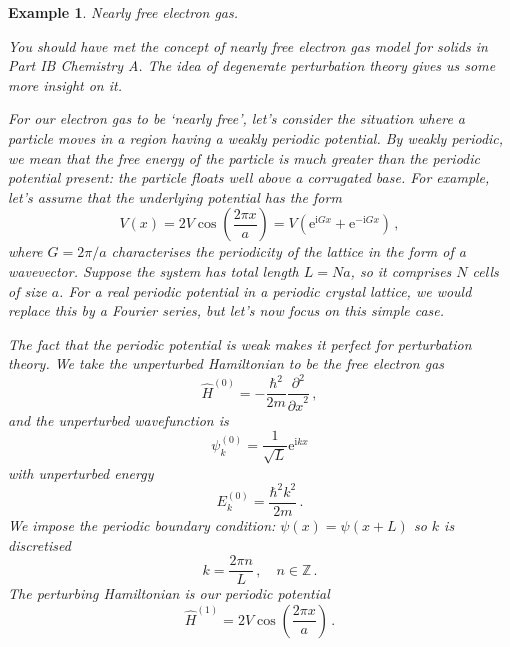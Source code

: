 \documentclass{article}
\theoremstyle{plain}\theoremheaderfont{\normalfont\itshape}\theorembodyfont{\rmfamily}\theoremseparator{.}\newtheorem*{rem}{Remark}\newtheorem*{ex}{Example}\newtheorem*{proof}{Proof}\newtheorem*{altp}{Alternative proof}
\theoremstyle{plain}\theoremheaderfont{\normalfont\bfseries}\theorembodyfont{\rmfamily}\theoremseparator{.}\newtheorem{thm}{Theorem}[section]\newtheorem{lem}[thm]{Lemma}\newtheorem{prop}[thm]{Proposition}\newtheorem*{cor}{Corollary}\newtheorem{defn}[thm]{Definition}\newtheorem{clm}[thm]{Claim}\newtheorem{clminproof}{Claim}
\theoremstyle{break}\theoremheaderfont{\normalfont\itshape}\theorembodyfont{\rmfamily}\theoremseparator{.\medskip}\newtheorem*{proofskip}{Proof}\newtheorem*{exs}{Examples}\newtheorem*{rems}{Remarks}
\theoremstyle{break}\theoremheaderfont{\normalfont\bfseries}\theorembodyfont{\rmfamily}\theoremseparator{.\medskip}\newtheorem{lemskip}[thm]{Lemma}\newtheorem{defnskip}[thm]{Definition}\newtheorem{propskip}[thm]{Proposition}\newtheorem{thmskip}[thm]{Theorem}
\numberwithin{equation}{section}
\newcommand{\ii}{\mathrm{i}}
\newcommand{\ee}{\mathrm{e}}
\newcommand{\pdv}[3][]{\frac{\partial^{#1} #2}{{\partial #3}^{#1}}}
\newcommand{\ZZ}{\mathbb{Z}}
\begin{document}
    \begin{ex}
        \textit{Nearly free electron gas.}

        You should have met the concept of nearly free electron gas model for solids in Part IB Chemistry A. The idea of degenerate perturbation theory gives us some more insight on it.

        For our electron gas to be `nearly free', let's consider the situation where a particle moves in a region having a weakly periodic potential. By weakly periodic, we mean that the free energy of the particle is much greater than the periodic potential present: the particle floats well above a corrugated base. For example, let's assume that the underlying potential has the form
        \begin{equation}
            V(x)=2V\cos\left(\frac{2\pi x}{a}\right)=V(\ee^{\ii Gx}+\ee^{-\ii Gx})\,,
        \end{equation}
        where \(G=2\pi/a\) characterises the periodicity of the lattice in the form of a wavevector. Suppose the system has total length \(L=Na\), so it comprises \(N\) cells of size \(a\). For a real periodic potential in a periodic crystal lattice, we would replace this by a Fourier series, but let's now focus on this simple case.

        The fact that the periodic potential is weak makes it perfect for perturbation theory. We take the unperturbed Hamiltonian to be the free electron gas
        \begin{equation}
            \hat{H}^{(0)}=-\frac{\hbar^2}{2m}\pdv[2]{}{x}\,,
        \end{equation}
        and the unperturbed wavefunction is
        \begin{equation}
            \psi_k^{(0)}=\frac{1}{\sqrt{L}}\ee^{\ii kx}
        \end{equation}
        with unperturbed energy
        \begin{equation}
            E_k^{(0)}=\frac{\hbar^2k^2}{2m}\,.
        \end{equation}
        We impose the periodic boundary condition: \(\psi(x)=\psi(x+L)\) so \(k\) is discretised
        \begin{equation}
            k=\frac{2\pi n}{L}\,,\quad n\in\ZZ\,.
        \end{equation}
        The perturbing Hamiltonian is our periodic potential
        \begin{equation}
            \hat{H}^{(1)}=2V\cos\left(\frac{2\pi x}{a}\right)\,.
        \end{equation}


\end{ex}
\end{document}
